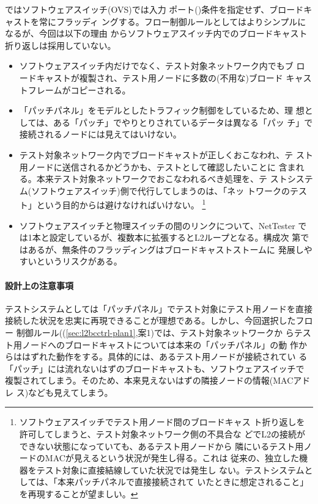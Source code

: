 ではソフトウェアスイッチ(OVS)では入力
ポート()条件を指定せず、ブロードキャストを常にフラッディ
ングする。フロー制御ルールとしてはよりシンプルになるが、今回は以下の理由
からソフトウェアスイッチ内でのブロードキャスト折り返しは採用していない。
\begin{itemize}
 \item ソフトウェアスイッチ内だけでなく、テスト対象ネットワーク内でもブ
       ロードキャストが複製され、テスト用ノードに多数の(不用な)ブロード
       キャストフレームがコピーされる。
 \item 「パッチパネル」をモデルとしたトラフィック制御をしているため、理
       想としては、ある「パッチ」でやりとりされているデータは異なる「パッ
       チ」で接続されるノードには見えてはいけない。
 \item テスト対象ネットワーク内でブロードキャストが正しくおこなわれ、テ
       スト用ノードに送信されるかどうかも、テストとして確認したいことに
       含まれる。本来テスト対象ネットワークでおこなわれるべき処理を、テ
       ストシステム(ソフトウェアスイッチ)側で代行してしまうのは、「ネッ
       トワークのテスト」という目的からは避けなければいけない。
       \footnote{ソフトウェアスイッチでテスト用ノード間のブロードキャス
       ト折り返しを許可してしまうと、テスト対象ネットワーク側の不具合な
       どでL2の接続ができない状態になっていても、あるテスト用ノードから
       隣にいるテスト用ノードのMACが見えるという状況が発生し得る。これは
       従来の、独立した機器をテスト対象に直接結線していた状況では発生し
       ない。テストシステムとしては、「本来パッチパネルで直接接続されて
       いたときに想定されること」を再現することが望ましい。}
 \item ソフトウェアスイッチと物理スイッチの間のリンクについて、NetTester
       では1本と設定しているが、複数本に拡張するとL2ループとなる。構成次
       第ではあるが、無条件のフラッディングはブロードキャストストームに
       発展しやすいというリスクがある。
\end{itemize}

\paragraph{設計上の注意事項}

テストシステムとしては「パッチパネル」でテスト対象にテスト用ノードを直接
接続した状況を忠実に再現できることが理想である。しかし、今回選択したフロー
制御ルール((\ref{sec:l2bcctrl-plan1},案1)では、テスト対象ネットワークか
らテスト用ノードへのブロードキャストについては本来の「パッチパネル」の動
作からははずれた動作をする。具体的には、あるテスト用ノードが接続されてい
る「パッチ」には流れないはずのブロードキャストも、ソフトウェアスイッチで
複製されてしまう。そのため、本来見えないはずの隣接ノードの情報(MACアドレ
ス)なども見えてしまう。

